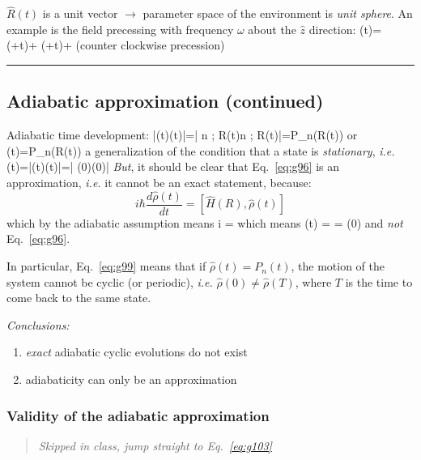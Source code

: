 \documentclass[12pt]{article}
\begin{document}
$\hat{R}(t)$ is a unit vector $\rightarrow$ parameter space of the
environment is \emph{unit sphere}.
An example is the field precessing with
frequency $\omega$ about the $\hat{z}$ direction:
\be
{}(t)= \sin \theta \cos (\phi+\omega t)+  \sin \theta \sin (\phi+\omega t)+ \cos \theta
\label{eq:g81}
\ee
(counter clockwise precession)

\rule{\textwidth}{1pt}


\setcounter{subsection}{2}
\subsection{Adiabatic approximation (continued)}
\setcounter{equation}{95}

Adiabatic time development:
\be
|\psi(t)\rangle\langle\psi(t)|=| n ; R(t)\rangle\langle n ; R(t)|=P_{n}(R(t))
\label{eq:g96}
\ee
or
\be
\hat{\rho}(t)=P_{n}(R(t))
\ee
a generalization of the condition that
a state is \emph{stationary}, \textit{i.e.}
\be
\hat{\rho}(t)=|\psi(t)\rangle\langle\psi(t)|=| \psi(0)\rangle\langle\psi(0)|
\ee
\emph{But}, it should be clear that Eq.~\eqref{eq:g96} is an
approximation, \textit{i.e.} it cannot be an exact
statement, because:
\[
i \hbar \frac{d \hat{\rho}(t)}{d t}=[\hat{H}(R), \hat{\rho}(t)]
\]
which by the adiabatic assumption means
\be
i \hbar {}=
\label{eq:g99}
\ee
which means
\be
\hat{\rho}(t) =  = \hat{\rho}(0)
\ee
and \emph{not} Eq.~\eqref{eq:g96}.

In particular, Eq.~\eqref{eq:g99} means that if
$\hat{\rho}(t)=P_{n}(t)$, the motion of the system cannot
be cyclic (or periodic), \textit{i.e.} $\hat{\rho}(0) \neq \hat{\rho}(T)$, where
$T$ is the time to come back to the same state.

\emph{Conclusions:}
\begin{enumerate}
\item \emph{exact} adiabatic cyclic evolutions do not exist
\item adiabaticity can only be an approximation
\end{enumerate}

\setcounter{subsubsection}{2}
\subsubsection{Validity of the adiabatic approximation}

\begin{quote}\emph{Skipped in class, jump straight to Eq.~\eqref{eq:g103}}\end{quote}
\end{document}

